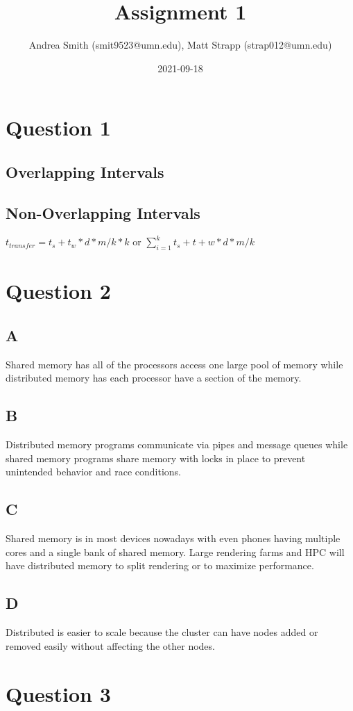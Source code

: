 \documentclass[12pt]{article}
\title{Assignment 1}
\author{Andrea Smith (smit9523@umn.edu), Matt Strapp (strap012@umn.edu)}
\date{2021-09-18}
\begin{document}
\maketitle
    \section{Question 1}
    \subsection{Overlapping Intervals}
    
    \subsection{Non-Overlapping Intervals}
        \(t_{transfer} = t_s+t_w*d*m/k*k\) or \(\sum_{i=1}^{k} t_s+t+w*d*m/k\)
    \section{Question 2}
    \subsection*{A}
    Shared memory has all of the processors access one large pool of memory while distributed memory has each processor have a section of the memory.
    \subsection*{B}
    Distributed memory programs communicate via pipes and message queues while shared memory programs share memory with locks in place to prevent unintended behavior and race conditions.
    \subsection*{C}
    Shared memory is in most devices nowadays with even phones having multiple cores and a single bank of shared memory. Large rendering farms and HPC will have distributed memory to split rendering or to maximize performance.
    \subsection*{D}
    Distributed is easier to scale because the cluster can have nodes added or removed easily without affecting the other nodes.
    \section{Question 3}
\end{document}
